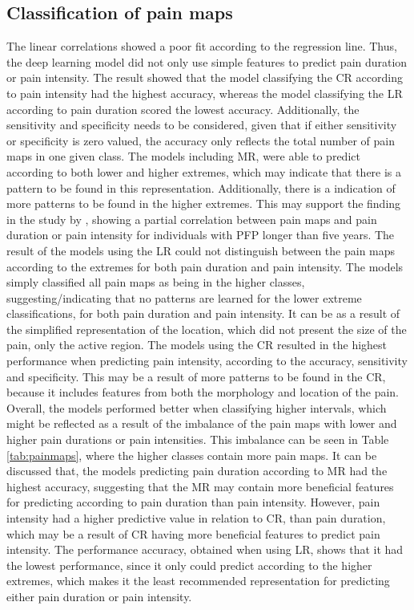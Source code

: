 \subsection{Classification of pain maps}
The linear correlations showed a poor fit according to the regression line. Thus, the deep learning model did not only use simple features to predict pain duration or pain intensity.
The result showed that the model classifying the CR according to pain intensity had the highest accuracy, whereas the model classifying the LR according to pain duration scored the lowest accuracy. Additionally, the sensitivity and specificity needs to be considered, given that if either sensitivity or specificity is zero valued, the accuracy only reflects the total number of pain maps in one given class.\newline
\noindent
The models including MR, were able to predict according to both lower and higher extremes, which may indicate that there is a pattern to be found in this representation. Additionally, there is a indication of more patterns to be found in the higher extremes. This may support  the finding in the study by \citeauthor{Boudreau2017} \citep{Boudreau2017}, showing a partial correlation between pain maps and pain duration or pain intensity for individuals with PFP longer than five years.
The result of the models using the LR could not distinguish between the pain maps according to the extremes for both pain duration and pain intensity. The models simply classified all pain maps as being in the higher classes, suggesting/indicating that no patterns are learned for the lower extreme classifications, for both pain duration and pain intensity. It can be as a result of the simplified representation of the location, which did not present the size of the pain, only the active region.
The models using the CR resulted in the highest performance when predicting pain intensity, according to the accuracy, sensitivity and specificity. This may be a result of more patterns to be found in the CR, because it includes features from both the morphology and location of the pain. 
Overall, the models performed better when classifying higher intervals, which might be reflected as a result of the imbalance of the pain maps with lower and higher pain durations or pain intensities. This imbalance can be seen in Table \ref{tab:painmaps}, where the higher classes contain more pain maps.
It can be discussed that, the models predicting pain duration according to MR had the highest accuracy, suggesting that the MR may contain more beneficial features for predicting according to pain duration than pain intensity. However, pain intensity had a higher predictive value in relation to CR, than pain duration, which may be a result of CR having more beneficial features to predict pain intensity. 
The performance accuracy, obtained when using LR, shows that it had the lowest performance, since it only could predict according to the higher extremes, which makes it the least recommended representation for predicting either pain duration or pain intensity.   

